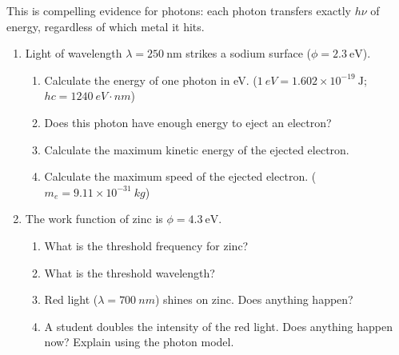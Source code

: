 \documentclass[12pt, a4paper]{book}
\begin{document}
This is compelling evidence for photons:
each photon transfers exactly $h\nu$ of energy,
regardless of which metal it hits.

\begin{problembox}
\begin{enumerate}[label=\textbf{\arabic*.}]
  \item Light of wavelength $\lambda = 250\ \si{\nano\metre}$
        strikes a sodium surface ($\phi = 2.3\ \si{\electronvolt}$).
        \begin{enumerate}[label=(\alph*)]
          \item Calculate the energy of one photon in eV.
                ($\SI{1}{eV} = 1.602\times10^{-19}\ \si{\joule}$;
                 $hc = 1240\ \si{eV\cdot nm}$)
          \item Does this photon have enough energy to eject
                an electron?
          \item Calculate the maximum kinetic energy of the
                ejected electron.
          \item Calculate the maximum speed of the ejected electron.
                ($m_e = 9.11\times10^{-31}\ \si{kg}$)
        \end{enumerate}

  \item The work function of zinc is
        $\phi = 4.3\ \si{\electronvolt}$.
        \begin{enumerate}[label=(\alph*)]
          \item What is the threshold frequency for zinc?
          \item What is the threshold wavelength?
          \item Red light ($\lambda = 700\ \si{nm}$) shines
                on zinc. Does anything happen?
          \item A student doubles the intensity of the red light.
                Does anything happen now?
                Explain using the photon model.
        \end{enumerate}


\end{enumerate}
\end{problembox}
\end{document}
